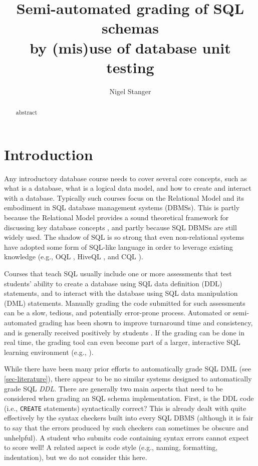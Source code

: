 \documentclass[sigconf, authordraft, capitalise]{acmart}
\title{Semi-automated grading of SQL schemas \\ by (mis)use of database unit testing}
\author{Nigel Stanger}
\affiliation{
    \institution{University of Otago}
    \department{Department of Information Science}
    \city{Dunedin}
    \country{New Zealand}
}
\begin{document}
\begin{abstract}
    abstract
\end{abstract}

\maketitle


\section{Introduction}

Any introductory database course needs to cover several core concepts, such as what is a database, what is a logical data model, and how to create and interact with a database. Typically such courses focus on the Relational Model and its embodiment in SQL database management systems (DBMSs). This is partly because the Relational Model provides a sound theoretical framework for discussing key database concepts \cite{Date.C-2009a-SQL-and-Relational}, and partly because SQL DBMSs are still widely used. The shadow of SQL is so strong that even non-relational systems have adopted some form of SQL-like language in order to leverage existing knowledge (e.g., OQL \cite{Cattell.R-2000a-ODMG3}, HiveQL \cite{Apache-2017a-Hive}, and CQL \cite{Apache-2017a-CQL}).

Courses that teach SQL usually include one or more assessments that test students' ability to create a database using SQL data definition (DDL) statements, and to interact with the database using SQL data manipulation (DML) statements. Manually grading the code submitted for such assessments can be a slow, tedious, and potentially error-prone process. Automated or semi-automated grading has been shown to improve turnaround time and consistency, and is generally received positively by students \cite{Douce.C-2005a-Automatic,Russell.G-2004a-Improving,Dekeyser.S-2007a-Computer,Prior.J-2004a-Backwash}. If the grading can be done in real time, the grading tool can even become part of a larger, interactive SQL learning environment (e.g.,  \cite{Kenny.C-2005a-Automated,Kleiner.C-2013a-Automated,Mitrovic.A-1998a-Learning,Russell.G-2004a-Improving,Sadiq.S-2004a-SQLator}).

While there have been many prior efforts to automatically grade SQL DML (see \cref{sec-literature}), there appear to be no similar systems designed to automatically grade SQL \emph{DDL}. There are generally two main aspects that need to be considered when grading an SQL schema implementation. First, is the DDL code (i.e., \texttt{CREATE} statements) syntactically correct? This is already dealt with quite effectively by the syntax checkers built into every SQL DBMS (although it is fair to say that the errors produced by such checkers can sometimes be obscure and unhelpful). A student who submits code containing syntax errors cannot expect to score well! A related aspect is code style (e.g., naming, formatting, indentation), but we do not consider this here.
    
\end{document}
